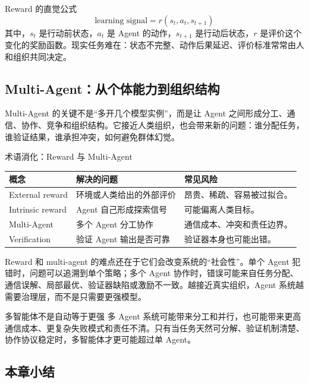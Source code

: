 \documentclass[a4paper]{article}
\begin{document}
\begin{importantbox}{Reward 的直觉公式}
\[
\text{learning signal} = r(s_t, a_t, s_{t+1})
\]
其中，\(s_t\) 是行动前状态，\(a_t\) 是 Agent 的动作，\(s_{t+1}\) 是行动后状态，\(r\) 是评价这个变化的奖励函数。现实任务难在：状态不完整、动作后果延迟、评价标准常常由人和组织共同决定。
\end{importantbox}

\subsection{Multi-Agent：从个体能力到组织结构}

Multi-Agent 的关键不是“多开几个模型实例”，而是让 Agent 之间形成分工、通信、协作、竞争和组织结构。它接近人类组织，也会带来新的问题：谁分配任务，谁验证结果，谁承担冲突，如何避免群体幻觉。

\begin{knowledgebox}{术语消化：Reward 与 Multi-Agent}
\begin{tabularx}{\textwidth}{p{}p{}X}
\toprule
概念 & 解决的问题 & 常见风险 \\
\midrule
External reward & 环境或人类给出的外部评价 & 昂贵、稀疏、容易被过拟合。 \\
Intrinsic reward & Agent 自己形成探索信号 & 可能偏离人类目标。 \\
Multi-Agent & 多个 Agent 分工协作 & 通信成本、冲突和责任边界。 \\
Verification & 验证 Agent 输出是否可靠 & 验证器本身也可能出错。 \\
\bottomrule
\end{tabularx}
\end{knowledgebox}

Reward 和 multi-agent 的难点还在于它们会改变系统的“社会性”。单个 Agent 犯错时，问题可以追溯到单个策略；多个 Agent 协作时，错误可能来自任务分配、通信误解、局部最优、验证器缺陷或激励不一致。越接近真实组织，Agent 系统越需要治理层，而不是只需要更强模型。

\begin{warningbox}{多智能体不是自动等于更强}
多 Agent 系统可能带来分工和并行，也可能带来更高通信成本、更复杂失败模式和责任不清。只有当任务天然可分解、验证机制清楚、协作协议稳定时，多智能体才更可能超过单 Agent。
\end{warningbox}

\subsection{本章小结}
\end{document}
